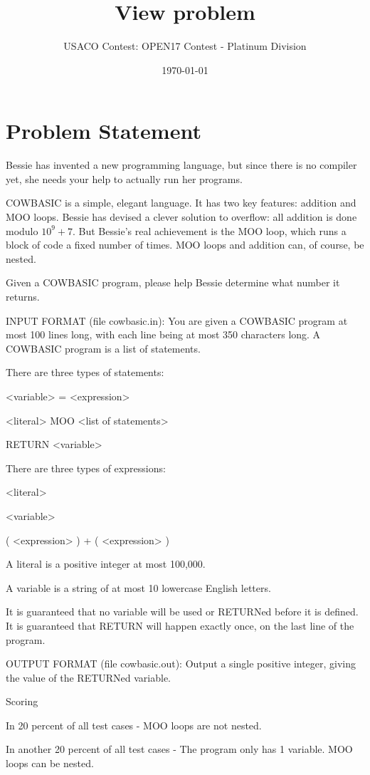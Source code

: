 \documentclass[12pt]{article}
\title{View problem}
\author{USACO Contest: OPEN17 Contest - Platinum Division}
\date{\today}
\begin{document}
\maketitle

\section*{Problem Statement}

Bessie has invented a new programming language, but since there is no compiler
yet, she needs your help to actually run her programs. 

COWBASIC is a simple, elegant language. It has two key features: addition and
MOO loops. Bessie has devised a clever solution to overflow: all addition is
done modulo $10^9+7$. But Bessie's real achievement is the MOO loop, which runs
a block of code a fixed number of times. MOO loops and addition can, of course,
be nested.

Given a COWBASIC program, please help Bessie determine what number it returns.

INPUT FORMAT (file cowbasic.in):
You are given a COWBASIC program at most 100 lines long, with each line being at
most 350 characters long. A COWBASIC program is a list of statements.

There are three types of statements:

<variable> = <expression>

<literal> MOO {
  <list of statements>
}

RETURN <variable>

There are three types of expressions:

<literal>

<variable>

( <expression> ) + ( <expression> )

A literal is a positive integer at most 100,000.

A variable is a string of at most 10 lowercase English letters.

It is guaranteed that no variable will be used or RETURNed before it is defined.
It is guaranteed that RETURN will happen exactly once, on the last line of the
program.

OUTPUT FORMAT (file cowbasic.out):
Output a single positive integer, giving the value of the RETURNed variable.

Scoring

In 20 percent of all test cases - MOO loops are not nested.

In another 20 percent of all test cases - The program only has 1 variable. MOO
loops can be nested.
\end{document}
